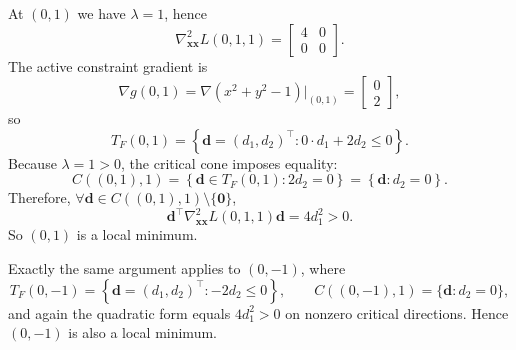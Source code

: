 \begin{example}
At $(0,1)$ we have $\lambda=1$, hence
\[
  \nabla_{\mathbf{x}\mathbf{x}}^2 L(0,1,1)
  =
  \begin{bmatrix}
    4 & 0 \\
    0 & 0
  \end{bmatrix}.
\]
The active constraint gradient is
\[
  \nabla g(0,1)=
  \nabla(x^2+y^2-1)\big|_{(0,1)}
  =
  \begin{bmatrix}
    0 \\
    2
  \end{bmatrix},
\]
so
\[
  T_F(0,1)
  = \left\{
    \mathbf{d}=(d_1,d_2)^\top:
    0\cdot d_1 + 2d_2 \le 0
  \right\}.
\]
Because $\lambda=1>0$, the critical cone imposes equality:
\[
  C((0,1),1)
  = \left\{
    \mathbf{d}\in T_F(0,1): 2d_2=0
  \right\}
  = \left\{
    \mathbf{d}: d_2=0
  \right\}.
\]
Therefore, \(\forall \mathbf{d}\in C((0,1),1)\setminus\{\mathbf{0}\}\),
\[
  \mathbf{d}^\top
  \nabla_{\mathbf{x}\mathbf{x}}^2 L(0,1,1)
  \mathbf{d}
  = 4d_1^2 > 0.
\]
So $(0,1)$ is a local minimum.

Exactly the same argument applies to $(0,-1)$, where
\[
  T_F(0,-1)
  = \left\{
    \mathbf{d}=(d_1,d_2)^\top:
    -2d_2 \le 0
  \right\},
  \qquad
  C((0,-1),1)=\{\mathbf{d}: d_2=0\},
\]
and again the quadratic form equals $4d_1^2>0$ on nonzero critical
directions. Hence $(0,-1)$ is also a local minimum.
\end{example}

